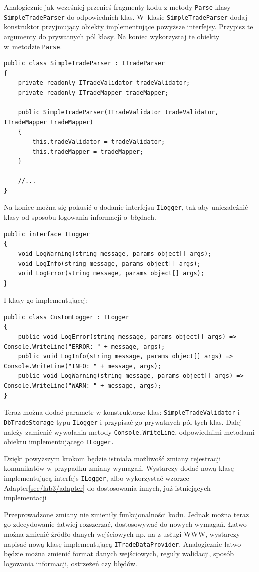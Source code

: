 Analogicznie jak wcześniej przenieś fragmenty kodu z metody \texttt{Parse} klasy \texttt{SimpleTradeParser} do odpowiednich klas. W~klasie \texttt{SimpleTradeParser} dodaj konstruktor przyjmujący obiekty implementujące powyższe interfejsy. Przypisz te argumenty do prywatnych pól klasy. Na koniec wykorzystaj te obiekty w~metodzie \texttt{Parse}.
\begin{lstlisting}
public class SimpleTradeParser : ITradeParser
{
	private readonly ITradeValidator tradeValidator;
	private readonly ITradeMapper tradeMapper;
	
	public SimpleTradeParser(ITradeValidator tradeValidator, ITradeMapper tradeMapper)
	{
		this.tradeValidator = tradeValidator;
		this.tradeMapper = tradeMapper;
	}

	//...
}	
\end{lstlisting}

Na koniec można się pokusić o dodanie interfejsu \texttt{ILogger}, tak aby uniezależnić klasy od sposobu logowania informacji o~błędach.
\begin{lstlisting}
public interface ILogger
{
	void LogWarning(string message, params object[] args);
	void LogInfo(string message, params object[] args);
	void LogError(string message, params object[] args);
}	
\end{lstlisting}
I klasy go implementującej:
\begin{lstlisting}
public class CustomLogger : ILogger
{
	public void LogError(string message, params object[] args) => Console.WriteLine("ERROR: " + message, args);
	public void LogInfo(string message, params object[] args) => Console.WriteLine("INFO: " + message, args);
	public void LogWarning(string message, params object[] args) => Console.WriteLine("WARN: " + message, args);
}	
\end{lstlisting}
Teraz można dodać parametr w konstruktorze klas: \texttt{SimpleTradeValidator} i \texttt{DbTradeStorage} typu \texttt{ILogger} i przypisać go prywatnych pól tych klas. Dalej należy zamienić wywołania metody \texttt{Console.WriteLine}, odpowiednimi metodami obiektu implementującego \texttt{ILogger.}

Dzięki powyższym krokom będzie istniała możliwość zmiany rejestracji komunikatów w przypadku zmiany wymagań. Wystarczy dodać nową klasę implementującą interfejs \texttt{ILogger}, albo wykorzystać wzorzec Adapter\ref{sec/lab3/adapter} do dostosowania innych, już istniejących implementacji


Przeprowadzone zmiany nie zmieniły funkcjonalności kodu. %
Jednak można teraz go zdecydowanie łatwiej rozszerzać, dostosowywać do nowych wymagań. Łatwo można zmienić źródło danych wejściowych np. na z usługi WWW, wystarczy napisać nową klasę implementującą \texttt{ITradeDataProvider}. Analogicznie łatwo będzie można zmienić format danych wejściowych, reguły walidacji, sposób logowania informacji, ostrzeżeń czy błędów.

